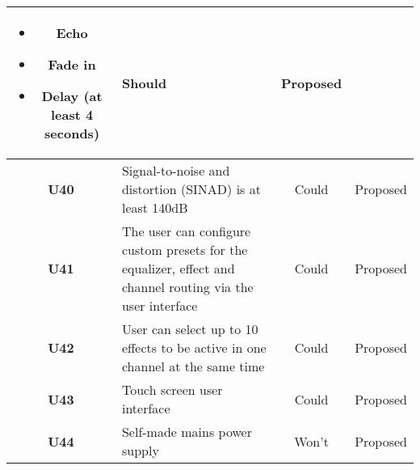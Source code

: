 \begin{longtable}{|c|p{10cm}|c|c|}
\begin{itemize}
		\item Echo
		\item Fade in
		\item Delay (at least 4 seconds)
	\end{itemize}																												& Should & Proposed\\ \hline
	\textbf{U40} &Signal-to-noise and distortion (SINAD) is at least 140dB 														& Could  & Proposed\\ \hline
	\textbf{U41} &The user can configure custom presets for the equalizer, effect and channel routing via the user interface	& Could  & Proposed\\ \hline
	\textbf{U42} &User can select up to 10 effects to be active in one channel at the same time 								& Could  & Proposed\\ \hline
	\textbf{U43} &Touch screen user interface 																					& Could  & Proposed\\ \hline
	\textbf{U44} &Self-made mains power supply  																				& Won't  & Proposed\\ \hline
\end{longtable}